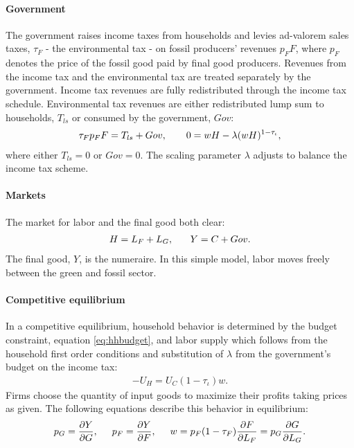 \paragraph{Government}
The government raises income taxes from households and levies ad-valorem sales taxes, $\tau_F$ - the environmental tax -  on fossil producers' revenues $p_FF$, where $p_F$ denotes the price of the fossil good paid by final good producers. Revenues from the income tax and the environmental tax are treated separately by the government. Income tax revenues are fully redistributed through the income tax schedule. Environmental tax revenues are either redistributed lump sum to households, $T_{ls}$ or consumed by the government, $Gov$:
\begin{align}
\tau_{F}p_FF=T_{ls}+Gov, \hspace{7mm}
0={w H}-\lambda(w H)^{1-\tau_{\iota}}, \label{eq:gov_but}
\end{align}
where either $T_{ls}=0$ or $Gov=0$.
The scaling parameter $\lambda$ adjusts to balance the income tax scheme. 

\paragraph{Markets}
The market for labor and the final good both clear: 
\begin{align}
H=L_F+L_G,\ \hspace{5mm} Y=C+Gov. \label{eq:market_clear}
\end{align}
 The final good, $Y$, is the numeraire. In this simple model, labor moves freely between the green and fossil sector. 
\paragraph{Competitive equilibrium}
In a competitive equilibrium, household behavior is determined by the budget constraint, equation \ref{eq:hhbudget}, and labor supply which follows from the household first order conditions and substitution of $\lambda$ from the government's budget on the income tax:
\begin{align}
-U_H=U_C(1-\tau_{\iota})w. \label{eq:hsup}
\end{align}
Firms choose the quantity of input goods to maximize their profits taking prices as given. The following equations describe this behavior in equilibrium:
\begin{align}
p_G=\frac{\partial Y}{\partial G}, \hspace{5mm}
p_F = \frac{\partial Y}{\partial F}, \hspace{5mm}
w= p_F(1-\tau_F)\frac{\partial F}{\partial L_F}=p_G\frac{\partial G}{\partial L_G}.\label{eq:profmax}
\end{align}

